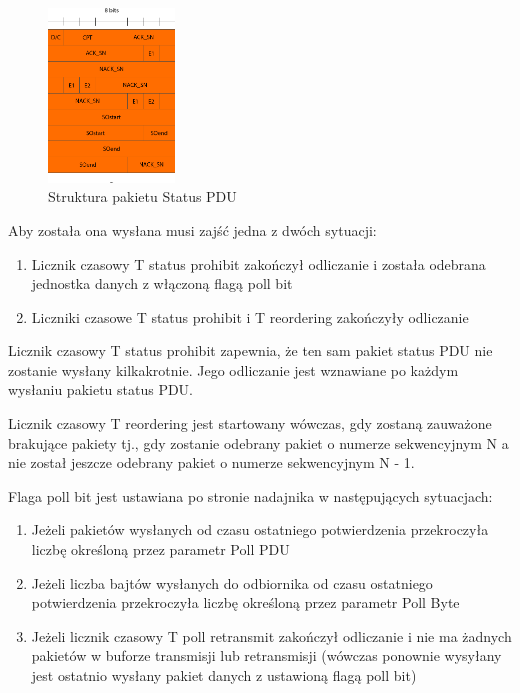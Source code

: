 \begin{figure}
	\centerline{\includegraphics[width=0.3\textwidth]{images/rlc_status_pdu.png}}
	\caption{Struktura pakietu Status PDU}
	\label{fig:status_pdu}
\end{figure}

Aby została ona wysłana musi zajść jedna z dwóch sytuacji:
\begin{enumerate}
	\item Licznik czasowy T status prohibit zakończył odliczanie i została odebrana jednostka danych z włączoną flagą poll bit
	\item Liczniki czasowe T status prohibit i T reordering zakończyły odliczanie
\end{enumerate}

Licznik czasowy T status prohibit zapewnia, że ten sam pakiet status PDU nie zostanie wysłany kilkakrotnie. Jego odliczanie jest wznawiane po każdym wysłaniu pakietu status PDU.

Licznik czasowy T reordering jest startowany wówczas, gdy zostaną zauważone brakujące pakiety tj., gdy zostanie odebrany pakiet o numerze sekwencyjnym N a nie został jeszcze odebrany pakiet o numerze sekwencyjnym N - 1.

Flaga poll bit jest ustawiana po stronie nadajnika w następujących sytuacjach:
\begin{enumerate}
	\item Jeżeli pakietów wysłanych od czasu ostatniego potwierdzenia przekroczyła liczbę określoną przez parametr Poll PDU
	\item Jeżeli liczba bajtów wysłanych do odbiornika od czasu ostatniego potwierdzenia przekroczyła liczbę określoną przez parametr Poll Byte
	\item Jeżeli licznik czasowy T poll retransmit zakończył odliczanie i nie ma żadnych pakietów w buforze transmisji lub retransmisji (wówczas ponownie wysyłany jest ostatnio wysłany pakiet danych z ustawioną flagą poll bit)
\end{enumerate}
